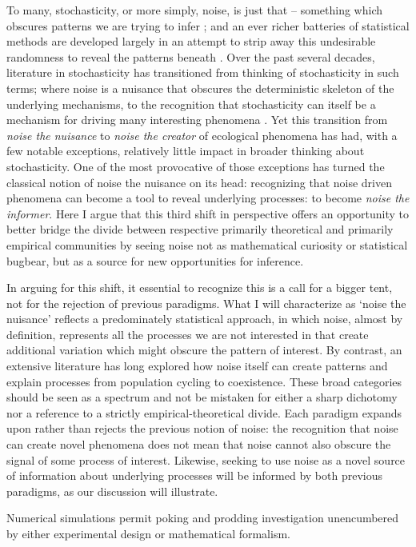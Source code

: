 \documentclass[preprint, 3p,
authoryear]{elsarticle} %
\begin{document}
To many, stochasticity, or more simply, noise, is just that -- something
which obscures patterns we are trying to infer \citep{Knape2011}; and an
ever richer batteries of statistical methods are developed largely in an
attempt to strip away this undesirable randomness to reveal the patterns
beneath \citep{Coulson2001}. Over the past several decades, literature
in stochasticity has transitioned from thinking of stochasticity in such
terms; where noise is a nuisance that obscures the deterministic
skeleton of the underlying mechanisms, to the recognition that
stochasticity can itself be a mechanism for driving many interesting
phenomena \citep{Coulson2004}. Yet this transition from \emph{noise the
nuisance} to \emph{noise the creator} of ecological phenomena has had,
with a few notable exceptions, relatively little impact in broader
thinking about stochasticity. One of the most provocative of those
exceptions has turned the classical notion of noise the nuisance on its
head: recognizing that noise driven phenomena can become a tool to
reveal underlying processes: to become \emph{noise the informer}. Here I
argue that this third shift in perspective offers an opportunity to
better bridge the divide between respective primarily theoretical and
primarily empirical communities by seeing noise not as mathematical
curiosity or statistical bugbear, but as a source for new opportunities
for inference.

In arguing for this shift, it essential to recognize this is a call for
a bigger tent, not for the rejection of previous paradigms. What I will
characterize as `noise the nuisance' reflects a predominately
statistical approach, in which noise, almost by definition, represents
all the processes we are not interested in that create additional
variation which might obscure the pattern of interest. By contrast, an
extensive literature has long explored how noise itself can create
patterns and explain processes from population cycling to coexistence.
These broad categories should be seen as a spectrum and not be mistaken
for either a sharp dichotomy nor a reference to a strictly
empirical-theoretical divide. Each paradigm expands upon rather than
rejects the previous notion of noise: the recognition that noise can
create novel phenomena does not mean that noise cannot also obscure the
signal of some process of interest. Likewise, seeking to use noise as a
novel source of information about underlying processes will be informed
by both previous paradigms, as our discussion will illustrate.

Numerical simulations permit poking and prodding investigation
unencumbered by either experimental design or mathematical formalism.
\end{document}
